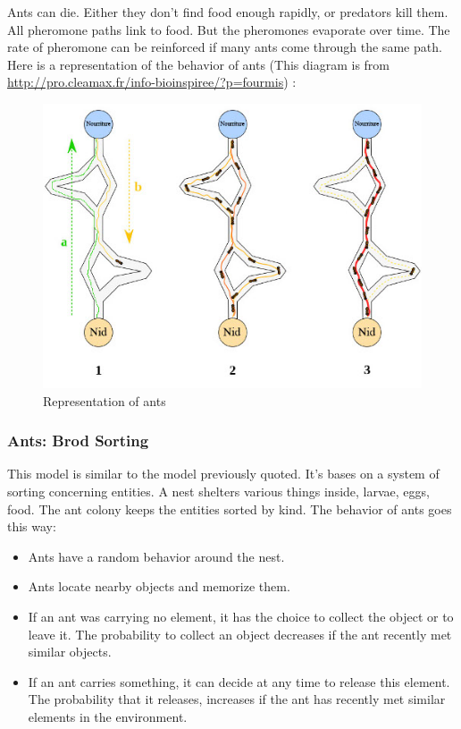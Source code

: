 Ants can die. Either they don't find food enough rapidly, or predators kill them.\\
All pheromone paths link to food. But the pheromones evaporate over time. The rate of pheromone can be reinforced if many ants come through the same path.\\
Here is a representation of the behavior of ants (This diagram is from \url{http://pro.cleamax.fr/info-bioinspiree/?p=fourmis}) :

\begin{figure}[h]
\center
\includegraphics{../images/SchemaFourmi.png}
\caption{\label{AntsRepresentation}Representation of ants}
\end{figure}

\newpage

\subsubsection{Ants: Brod Sorting}

This model is similar to the model previously quoted. It's bases on a system of sorting concerning entities. A nest shelters various things inside, larvae, eggs, food. The ant colony keeps the entities sorted by kind.
The behavior of ants goes this way:

\begin{itemize}
\item Ants have a random behavior around the nest.
\item Ants locate nearby objects and memorize them.
\item If an ant was carrying no element, it has the choice to collect the object or to leave it. The probability to collect an object decreases if the ant recently met similar objects.
\item If an ant carries something, it can decide at any time to release this element. The probability that it releases, increases if the ant has recently met similar elements in the environment.
\end{itemize}

